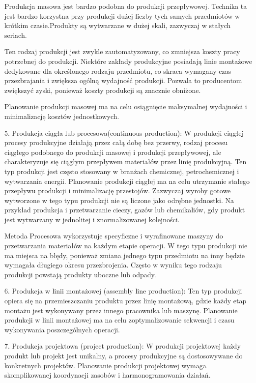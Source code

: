 Produkcja masowa jest bardzo podobna do produkcji przepływowej. Technika ta jest bardzo korzystna przy produkcji dużej liczby tych samych przedmiotów w krótkim czasie.Produkty są wytwarzane w dużej skali, zazwyczaj w stałych seriach.

Ten rodzaj produkcji jest zwykle zautomatyzowany, co zmniejsza koszty pracy potrzebnej do produkcji. Niektóre zakłady produkcyjne posiadają linie montażowe dedykowane dla określonego rodzaju przedmiotu, co skraca wymagany czas przezbrajania i zwiększa ogólną wydajność produkcji. Pozwala to producentom zwiększyć zyski, ponieważ koszty produkcji są znacznie obniżone.

Planowanie produkcji masowej ma na celu osiągnięcie maksymalnej wydajności i minimalizację kosztów jednostkowych.

    
 5. Produkcja ciągła lub procesowa(continuous production): W produkcji ciągłej procesy produkcyjne działają przez całą dobę bez przerwy, rodzaj procesu ciągłego podobnego do produkcji masowej i produkcji przepływowej, ale charakteryzuje się ciągłym przepływem materiałów przez linię produkcyjną. Ten typ produkcji jest często stosowany w branżach chemicznej, petrochemicznej i wytwarzania energii. Planowanie produkcji ciągłej ma na celu utrzymanie stałego przepływu produkcji i minimalizację przestojów.
 Zazwyczaj wyroby gotowe wytworzone w tego typu produkcji nie są liczone jako odrębne jednostki. Na przykład produkcja i przetwarzanie cieczy, gazów lub chemikaliów, gdy produkt jest wytwarzany w jednolitej i znormalizowanej kolejności.

Metoda Procesowa wykorzystuje specyficzne i wyrafinowane maszyny do przetwarzania materiałów na każdym etapie operacji. W tego typu produkcji nie ma miejsca na błędy, ponieważ zmiana jednego typu przedmiotu na inny będzie wymagała długiego okresu przezbrojenia. Często w wyniku tego rodzaju produkcji powstają produkty uboczne lub odpady.

    
6. Produkcja w linii montażowej (assembly line production): Ten typ produkcji opiera się na przemieszczaniu produktu przez linię montażową, gdzie każdy etap montażu jest wykonywany przez innego pracownika lub maszynę. Planowanie produkcji w linii montażowej ma na celu zoptymalizowanie sekwencji i czasu wykonywania poszczególnych operacji.
    
7. Produkcja projektowa (project production): W produkcji projektowej każdy produkt lub projekt jest unikalny, a procesy produkcyjne są dostosowywane do konkretnych projektów. Planowanie produkcji projektowej wymaga skomplikowanej koordynacji zasobów i harmonogramowania działań.
    

